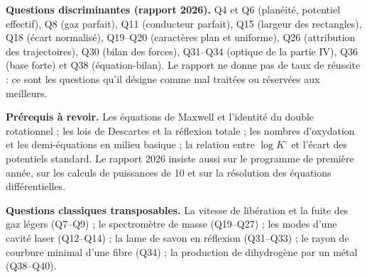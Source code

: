 \documentclass[11pt,a4paper]{article}
\begin{document}
\textbf{Questions discriminantes (rapport 2026).} Q4 et Q6 (planéité, potentiel effectif), Q8 (gaz parfait), Q11 (conducteur parfait), Q15 (largeur des rectangles), Q18 (écart normalisé), Q19--Q20 (caractères plan et uniforme), Q26 (attribution des trajectoires), Q30 (bilan des forces), Q31--Q34 (optique de la partie IV), Q36 (base forte) et Q38 (équation-bilan). Le rapport ne donne pas de taux de réussite : ce sont les questions qu'il désigne comme mal traitées ou réservées aux meilleurs.

\textbf{Prérequis à revoir.} Les équations de Maxwell et l'identité du double rotationnel ; les lois de Descartes et la réflexion totale ; les nombres d'oxydation et les demi-équations en milieu basique ; la relation entre \(\log K^\circ\) et l'écart des potentiels standard. Le rapport 2026 insiste aussi sur le programme de première année, sur les calculs de puissances de 10 et sur la résolution des équations différentielles.

\textbf{Questions classiques transposables.} La vitesse de libération et la fuite des gaz légers (Q7--Q9) ; le spectromètre de masse (Q19--Q27) ; les modes d'une cavité laser (Q12--Q14) ; la lame de savon en réflexion (Q31--Q33) ; le rayon de courbure minimal d'une fibre (Q34) ; la production de dihydrogène par un métal (Q38--Q40).
\end{document}

